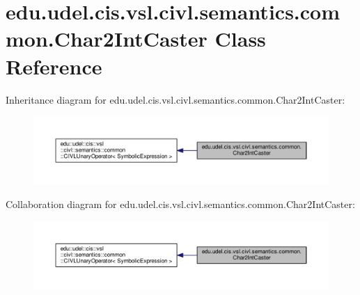 \hypertarget{classedu_1_1udel_1_1cis_1_1vsl_1_1civl_1_1semantics_1_1common_1_1Char2IntCaster}{}\section{edu.\+udel.\+cis.\+vsl.\+civl.\+semantics.\+common.\+Char2\+Int\+Caster Class Reference}
\label{classedu_1_1udel_1_1cis_1_1vsl_1_1civl_1_1semantics_1_1common_1_1Char2IntCaster}


Inheritance diagram for edu.\+udel.\+cis.\+vsl.\+civl.\+semantics.\+common.\+Char2\+Int\+Caster\+:
\nopagebreak
\begin{figure}[H]
\begin{center}
\leavevmode
\includegraphics[width=350pt]{classedu_1_1udel_1_1cis_1_1vsl_1_1civl_1_1semantics_1_1common_1_1Char2IntCaster__inherit__graph}
\end{center}
\end{figure}


Collaboration diagram for edu.\+udel.\+cis.\+vsl.\+civl.\+semantics.\+common.\+Char2\+Int\+Caster\+:
\nopagebreak
\begin{figure}[H]
\begin{center}
\leavevmode
\includegraphics[width=350pt]{classedu_1_1udel_1_1cis_1_1vsl_1_1civl_1_1semantics_1_1common_1_1Char2IntCaster__coll__graph}
\end{center}
\end{figure}
